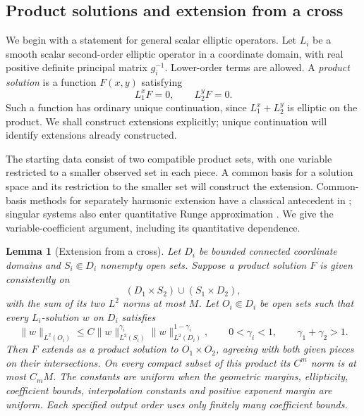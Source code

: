 \documentclass[11pt]{article}
\newtheorem{lemma}[theorem]{Lemma}
\theoremstyle{definition}
\theoremstyle{remark}
\numberwithin{equation}{section}
\begin{document}
\subsection{Product solutions and extension from a cross}

We begin with a statement for general scalar elliptic operators. Let
$L_i$ be a smooth scalar second-order elliptic operator in a coordinate
domain, with real positive definite principal matrix $g_i^{-1}$.
Lower-order terms are allowed. A \emph{product solution} is a function
$F(x,y)$ satisfying
\[
 L_1^xF=0,\qquad L_2^yF=0.
\]
Such a function has ordinary unique continuation, since $L_1^x+L_2^y$
is elliptic on the product. We shall construct extensions explicitly;
unique continuation will identify extensions already constructed.

The starting data consist of two compatible product sets, with one
variable restricted to a smaller observed set in each piece. A common
basis for a solution space and its restriction to the smaller set will
construct the extension. Common-basis methods for separately harmonic
extension have a classical antecedent in \citet{Zeriahi1982}; singular
systems also enter quantitative Runge approximation
\cite{RulandSalo2019}. We give the variable-coefficient argument,
including its quantitative dependence.

\begin{lemma}[Extension from a cross]\label{cross:series}
Let $D_i$ be bounded connected coordinate domains and
$S_i\Subset D_i$ nonempty open sets.  Suppose a product solution $F$ is
given consistently on
\[
 (D_1\times S_2)\cup(S_1\times D_2),
\]
with the sum of its two $L^2$ norms at most $M$.
Let $O_i\Subset D_i$ be open sets such that every $L_i$-solution $w$
on $D_i$ satisfies
\begin{equation}\label{cross:interpolation-input}
 \|w\|_{L^2(O_i)}
 \le C\|w\|_{L^2(S_i)}^{\gamma_i}
          \|w\|_{L^2(D_i)}^{1-\gamma_i},
 \qquad 0<\gamma_i<1,\qquad \gamma_1+\gamma_2>1.
\end{equation}
Then $F$ extends as a product solution to $O_1\times O_2$, agreeing
with both given pieces on their intersections.  On every compact
subset of this product its $C^m$ norm is at most $C_mM$.
The constants are uniform when the geometric margins, ellipticity,
coefficient bounds, interpolation constants and positive exponent
margin are uniform.  Each specified output order uses only finitely
many coefficient bounds.
\end{lemma}
\end{document}

